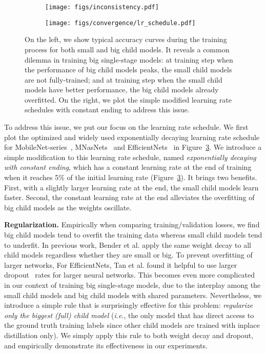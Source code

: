 \documentclass[runningheads]{llncs}
\def\onedot{.}
\def\ie{\emph{i.e}\onedot} \def\Ie{\emph{I.e}\onedot}
\begin{document}
\begin{figure}[ht]
    \centering
    \begin{subfigure}[b]{0.48\textwidth}
        \centering
        \texttt{[image: figs/inconsistency.pdf]}
        \caption{}
        \label{figs:convergence_a}
    \end{subfigure}
    \begin{subfigure}[b]{0.48\textwidth}
        \texttt{[image: figs/convergence/lr\_schedule.pdf]}
        \caption{}
        \label{figs:convergence_b}
    \end{subfigure}
\caption{On the left, we show typical accuracy curves during the training process for both small and big child models. It reveals a common dilemma in training big single-stage models: at training step  when the performance of big child models peaks, the small child models are not fully-trained; and at training step  when the small child models have better performance, the big child models already overfitted. On the right, we plot the simple modified learning rate schedules with constant ending to address this issue.
}
\end{figure}

To address this issue, we put our focus on the learning rate schedule. We first plot the optimized and widely used exponentially decaying learning rate schedule for MobileNet-series~\cite{howard2017mobilenets, sandler2018inverted, howard2019searching}, MNasNets~\cite{tan2018mnasnet} and EfficientNets~\cite{tan2019efficientnet} in Figure~\ref{figs:convergence_b}. We introduce a simple modification to this learning rate schedule, named \textit{exponentially decaying with constant ending}, which has a constant learning rate at the end of training when it reaches 5\% of the initial learning rate (Figure~\ref{figs:convergence_b}). It brings two benefits. First, with a slightly larger learning rate at the end, the small child models learn faster. Second, the constant learning rate at the end alleviates the overfitting of big child models as the weights oscillate.

\textbf{Regularization.} Empirically when comparing training/validation losses, we find big child models tend to overfit the training data whereas small child models tend to underfit. In previous work, Bender et al. \cite{bender2018understanding} apply the same weight decay to all child models regardless whether they are small or big. To prevent overfitting of larger networks, For EfficientNets, Tan et al. \cite{tan2019efficientnet} found it helpful to use larger dropout~\cite{srivastava2014dropout} rates for larger neural networks.
This becomes even more complicated in our context of training big single-stage models, due to the interplay among the small child models and big child models with shared parameters. Nevertheless, we introduce a simple rule that is surprisingly effective for this problem: \textit{regularize only the biggest (full) child model} (\ie, the only model that has direct access to the ground truth training labels since other child models are trained with inplace distillation only). We simply apply this rule to both weight decay and dropout, and empirically demonstrate its effectiveness in our experiments.
\end{document}
